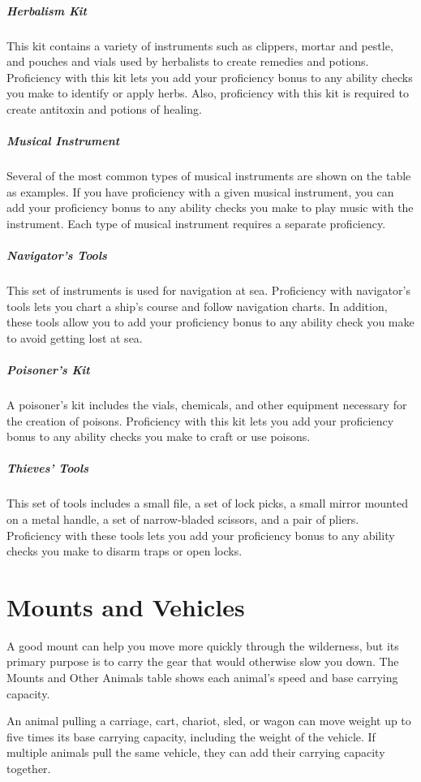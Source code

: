 \subparagraph*{Herbalism Kit} This kit contains a variety of instruments such as clippers, mortar and pestle, and pouches and vials used by herbalists to create remedies and potions. Proficiency with this kit lets you add your proficiency bonus to any ability checks you make to identify or apply herbs. Also, proficiency with this kit is required to create antitoxin and potions of healing.

\subparagraph*{Musical Instrument} Several of the most common types of musical instruments are shown on the table as examples. If you have proficiency with a given musical instrument, you can add your proficiency bonus to any ability checks you make to play music with the instrument. Each type of musical instrument requires a separate proficiency.

\subparagraph*{Navigator's Tools} This set of instruments is used for navigation at sea. Proficiency with navigator's tools lets you chart a ship's course and follow navigation charts. In addition, these tools allow you to add your proficiency bonus to any ability check you make to avoid getting lost at sea.

\subparagraph*{Poisoner's Kit} A poisoner's kit includes the vials, chemicals, and other equipment necessary for the creation of poisons. Proficiency with this kit lets you add your proficiency bonus to any ability checks you make to craft or use poisons.

\subparagraph*{Thieves' Tools} This set of tools includes a small file, a set of lock picks, a small mirror mounted on a metal handle, a set of narrow-bladed scissors, and a pair of pliers. Proficiency with these tools lets you add your proficiency bonus to any ability checks you make to disarm traps or open locks.

\section{Mounts and Vehicles}

A good mount can help you move more quickly through the wilderness, but its primary purpose is to carry the gear that would otherwise slow you down. The Mounts and Other Animals table shows each animal's speed and base carrying capacity.

An animal pulling a carriage, cart, chariot, sled, or wagon can move weight up to five times its base carrying capacity, including the weight of the vehicle. If multiple animals pull the same vehicle, they can add their carrying capacity together.


